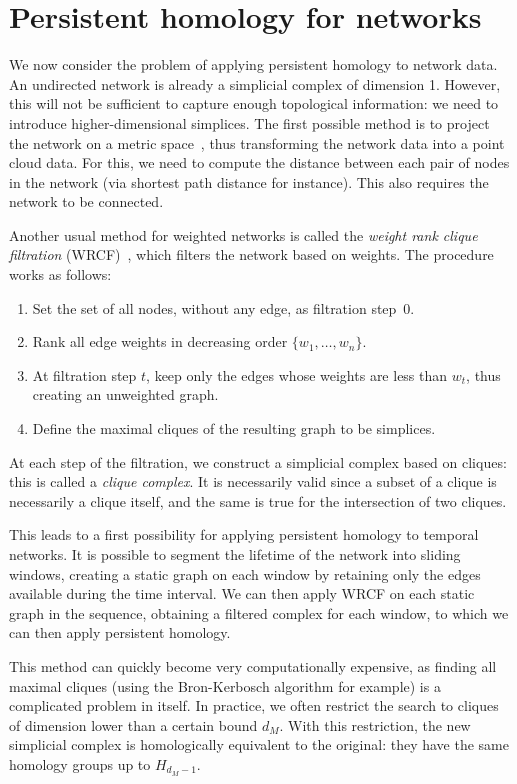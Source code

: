 \documentclass[a4paper,11pt,openany,extrafontsizes]{memoir}
\begin{document}
\section{Persistent homology for networks}%
\label{sec:pers-homol-netw}

We now consider the problem of applying persistent homology to network
data. An undirected network is already a simplicial complex of
dimension 1. However, this will not be sufficient to capture enough
topological information: we need to introduce higher-dimensional
simplices. The first possible method is to project the network on a
metric space~\cite{otter_roadmap_2017}, thus transforming the network
data into a point cloud data. For this, we need to compute the
distance between each pair of nodes in the network (via shortest path
distance for instance). This also requires the network to be
connected.

Another usual method for weighted networks is called the \emph{weight
  rank clique filtration} (WRCF)~\cite{petri_topological_2013}, which
filters the network based on weights. The procedure works as follows:
\begin{enumerate}
\item Set the set of all nodes, without any edge, as filtration
  step~0.
\item Rank all edge weights in decreasing order $\{w_1,\ldots,w_n\}$.
\item At filtration step $t$, keep only the edges whose weights are
  less than $w_t$, thus creating an unweighted graph.
\item Define the maximal cliques of the resulting graph to be
  simplices.
\end{enumerate}

At each step of the filtration, we construct a simplicial complex
based on cliques: this is called a \emph{clique complex}. It is
necessarily valid since a subset of a clique is necessarily a clique
itself, and the same is true for the intersection of two cliques.

This leads to a first possibility for applying persistent homology to
temporal networks. It is possible to segment the lifetime of the
network into sliding windows, creating a static graph on each window
by retaining only the edges available during the time interval. We can
then apply WRCF on each static graph in the sequence, obtaining a
filtered complex for each window, to which we can then apply
persistent homology.

This method can quickly become very computationally expensive, as
finding all maximal cliques (using the Bron-Kerbosch algorithm for
example) is a complicated problem in itself. In practice, we often
restrict the search to cliques of dimension lower than a certain bound
$d_M$. With this restriction, the new simplicial complex is
homologically equivalent to the original: they have the same homology
groups up to $H_{d_M-1}$.
\end{document}
